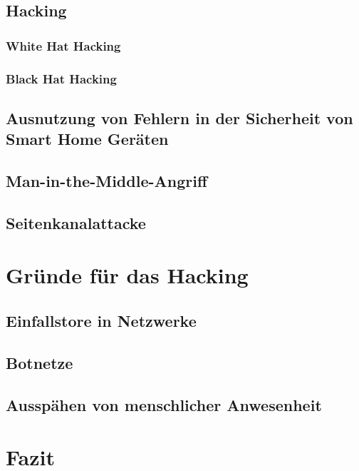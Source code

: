 \documentclass[12pt, a4paper, onecolumn, oneside, toc=bibliographynumbered, liststotoc]{scrartcl} %
\begin{document}
		\subsection{Hacking}
			\subsubsection{White Hat Hacking}
			\subsubsection{Black Hat Hacking}
		\subsection{Ausnutzung von Fehlern in der Sicherheit von Smart Home Geräten}
		\subsection{Man-in-the-Middle-Angriff}
		\subsection{Seitenkanalattacke}
		
	\section{Gründe für das Hacking}
		\subsection{Einfallstore in Netzwerke}
		\subsection{Botnetze}		
		\subsection{Ausspähen von menschlicher Anwesenheit}
	\section{Fazit}

\newpage %
\appendix %
\printbibliography %
\listoffigures %
\end{document}
